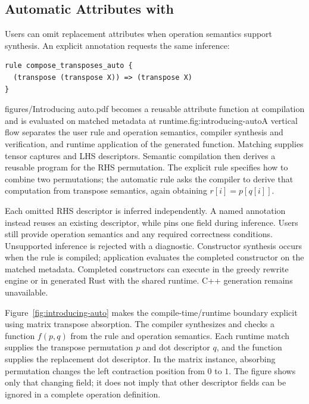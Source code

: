 \subsection{Automatic Attributes with \texorpdfstring{}{auto}}
\label{sec:auto}
Users can omit replacement attributes when operation semantics support
synthesis. An explicit \code{[auto]} annotation requests the same inference:
\begin{codeblock}[H]
\begin{lstlisting}[language=TEPL]
rule compose_transposes_auto {
  (transpose (transpose X)) => (transpose X)
}
\end{lstlisting}
\end{codeblock}
\begin{figuretext}{figures/Introducing auto.pdf}{ becomes a reusable attribute function at compilation and is evaluated on matched metadata at runtime.}{fig:introducing-auto}{A vertical flow separates the user rule and operation semantics, compiler
synthesis and verification, and runtime application of the generated function.}
Matching supplies tensor captures and LHS descriptors. Semantic compilation
then derives a reusable program for the RHS permutation. The explicit rule
specifies how to combine two permutations; the automatic rule asks the compiler
to derive that computation from transpose semantics, again obtaining
$r[i]=p[q[i]]$.

Each omitted RHS descriptor is inferred independently. A named annotation
\code{[@name]} instead reuses an existing descriptor, while
\code{[auto, field = value]} pins one field during inference. Users still
provide operation semantics and any required correctness conditions.
Unsupported inference is rejected with a diagnostic. Constructor synthesis
occurs when the rule is compiled; application evaluates the completed
constructor on the matched metadata. Completed constructors can execute in
the greedy rewrite engine or in generated Rust with the shared runtime.
C++ generation remains unavailable.

Figure~\ref{fig:introducing-auto} makes the compile-time/runtime boundary
explicit using matrix transpose absorption. The compiler synthesizes and
checks a function $f(p,q)$ from the rule and operation semantics. Each runtime
match supplies the transpose permutation $p$ and dot descriptor $q$, and the
function supplies the replacement dot descriptor. In the matrix instance,
absorbing permutation \code{[1,0]} changes the left contraction position from
$0$ to $1$. The figure shows only that changing field; it does not imply that
other descriptor fields can be ignored in a complete operation definition.
\end{figuretext}

